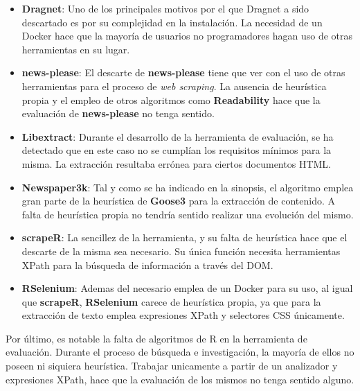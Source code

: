 \begin{itemize}
  \item \textbf{Dragnet}: Uno de los principales motivos por el que Dragnet a sido descartado es por su 
  complejidad en la instalación. La necesidad de un Docker hace que la mayoría de usuarios no programadores 
  hagan uso de otras herramientas en su lugar.
  \item \textbf{news-please}: El descarte de \textbf{news-please} tiene que ver con el uso de otras
  herramientas para el proceso de \emph{web scraping}. La ausencia de heurística propia y el empleo de otros 
  algoritmos como \textbf{Readability} hace que la evaluación de \textbf{news-please} no tenga sentido.
  \item \textbf{Libextract}: Durante el desarrollo de la herramienta de evaluación, se ha detectado que en
  este caso no se cumplían los requisitos mínimos para la misma. La extracción resultaba errónea para
  ciertos documentos HTML.
  \item \textbf{Newspaper3k}: Tal y como se ha indicado en la sinopsis, el algoritmo emplea gran parte de
  la heurística de \textbf{Goose3} para la extracción de contenido. A falta de heurística propia no tendría
  sentido realizar una evolución del mismo.
  \item \textbf{scrapeR}: La sencillez de la herramienta, y su falta de heurística hace que el descarte 
  de la misma sea necesario. Su única función necesita herramientas XPath para la búsqueda de información
  a través del DOM.
  \item \textbf{RSelenium}: Ademas del necesario emplea de un Docker para su uso, al igual que 
  \textbf{scrapeR}, \textbf{RSelenium} carece de heurística propia, ya que para la extracción de texto 
  emplea expresiones XPath y selectores CSS únicamente.
\end{itemize}

Por último, es notable la falta de algoritmos de R en la herramienta de evaluación. Durante el proceso de
búsqueda e investigación, la mayoría de ellos no poseen ni siquiera heurística. Trabajar unicamente a 
partir de un analizador y expresiones XPath, hace que la evaluación de los mismos no tenga sentido alguno.

